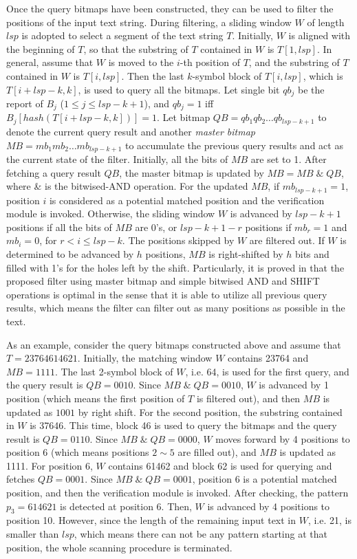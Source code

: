 \documentclass{article}
\begin{document}
Once the query bitmaps have been constructed, they can be used to
filter the positions of the input text string. During filtering, a
sliding window $W$ of length $lsp$ is adopted to select a segment of
the text string $T$. Initially, $W$ is aligned with the beginning of
$T$, so that the substring of $T$ contained in $W$ is $T[1,lsp]$. In
general, assume that $W$ is moved to the $i$-th position of $T$, and
the substring of $T$ contained in $W$ is $T[i,lsp]$. Then the last
$k$-symbol block of $T[i,lsp]$, which is $T[i+lsp-k, k]$, is used to
query all the bitmaps. Let single bit $qb_j$ be the report of $B_j$
($1 \leq j \leq lsp - k + 1$), and $qb_j=1$ iff
$B_j[hash(T[i+lsp-k,k])] = 1$. Let bitmap
$QB = qb_1qb_2 \dots qb_{lsp-k+1}$ to denote the current query result
and another \emph{master bitmap} $MB = mb_1mb_2 \dots mb_{lsp-k+1}$ to
accumulate the previous query results and act as the current state of
the filter. Initially, all the bits of $MB$ are set to 1. After
fetching a query result $QB$, the master bitmap is updated by
$MB = MB \; \& \; QB$, where \& is the bitwised-AND operation. For the
updated $MB$, if $mb_{lsp-k+1} = 1$, position $i$ is considered as a
potential matched position and the verification module is
invoked. Otherwise, the sliding window $W$ is advanced by $lsp-k+1$
positions if all the bits of $MB$ are 0's, or $lsp-k+1-r$ positions if
$mb_r=1$ and $mb_i=0$, for $r < i \leq lsp-k$. The positions skipped
by $W$ are filtered out. If $W$ is determined to be advanced by $h$
positions, $MB$ is right-shifted by $h$ bits and filled with 1's for
the holes left by the shift. Particularly, it is proved in
\cite{Lee2013} that the proposed filter using master bitmap and simple
bitwised AND and SHIFT operations is optimal in the sense that it is
able to utilize all previous query results, which means the filter can
filter out as many positions as possible in the text.

As an example, consider the query bitmaps constructed above and assume
that $T=23764614621$. Initially, the matching window $W$ contains
23764 and $MB = 1111$. The last 2-symbol block of $W$, i.e. 64, is
used for the first query, and the query result is $QB=0010$. Since
$MB\; \&\; QB = 0010$, $W$ is advanced by 1 position (which means the
first position of $T$ is filtered out), and then $MB$ is updated as
$1001$ by right shift. For the second position, the substring
contained in $W$ is 37646.  This time, block 46 is used to query the
bitmaps and the query result is $QB=0110$. Since $MB\; \& \; QB=0000$,
$W$ moves forward by 4 positions to position 6 (which means positions
$2 \sim 5$ are filled out), and $MB$ is updated as 1111. For position
6, $W$ contains 61462 and block 62 is used for querying and fetches
$QB = 0001$. Since $MB\; \& \; QB = 0001$, position 6 is a potential
matched position, and then the verification module is invoked. After
checking, the pattern $p_3=614621$ is detected at position 6. Then,
$W$ is advanced by 4 positions to position 10. However, since the
length of the remaining input text in $W$, i.e. 21, is smaller than
$lsp$, which means there can not be any pattern starting at that
position, the whole scanning procedure is terminated.
\end{document}
